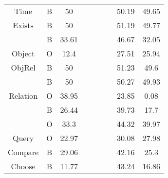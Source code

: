 \begin{tabular}{ccccccccc}
Time                                              & B                    & 50                   &            &             &            &            & 50.19       & 49.65      \\
\rowcolor[HTML]{F3F3F3} 
Exists                                            & B                    & 50                   &            &             &            &            & 51.19       & 49.77      \\
                                                  & B                    & 33.61                &            &             &            &            & 46.67       & 32.05      \\
\multirow{-2}{*}{Object}                          & O                    & 12.4                 &            &             &            &            & 27.51       & 25.94      \\
\rowcolor[HTML]{F3F3F3} 
ObjRel                                            & B                    & 50                   &            &             &            &            & 51.23       & 49.6       \\
                                                  & B                    & 50                   &            &             &            &            & 50.27       & 49.93      \\
\multirow{-2}{*}{Relation}                        & O                    & 38.95                &            &             &            &            & 23.85       & 0.08       \\
\rowcolor[HTML]{F3F3F3} 
\cellcolor[HTML]{F3F3F3}                          & B                    & 26.44                &            &             &            &            & 39.73       & 17.7       \\
\rowcolor[HTML]{F3F3F3} 
\multirow{-2}{*}{\cellcolor[HTML]{F3F3F3}Action}  & O                    & 33.3                 &            &             &            &            & 44.32       & 39.97      \\
Query                                             & O                    & 22.97                &            &             &            &            & 30.08       & 27.98      \\
\rowcolor[HTML]{F3F3F3} 
Compare                                           & B                    & 29.06                &            &             &            &            & 42.16       & 25.3       \\
Choose                                            & B                    & 11.77                &            &             &            &            & 43.24       & 16.86      \\

\end{tabular}
